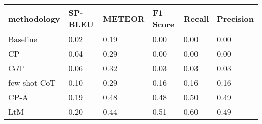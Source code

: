 \begin{tabular}{llllll}
\toprule
methodology & SP-BLEU & METEOR & F1 Score & Recall & Precision \\
\midrule
Baseline & 0.02 & 0.19 & 0.00 & 0.00 & 0.00 \\
CP & 0.04 & 0.29 & 0.00 & 0.00 & 0.00 \\
CoT & 0.06 & 0.32 & 0.03 & 0.03 & 0.03 \\
few-shot CoT & 0.10 & 0.29 & 0.16 & 0.16 & 0.16 \\
CP-A & 0.19 & 0.48 & 0.48 & 0.50 & 0.49 \\
LtM & 0.20 & 0.44 & 0.51 & 0.60 & 0.49 \\
\bottomrule
\end{tabular}
